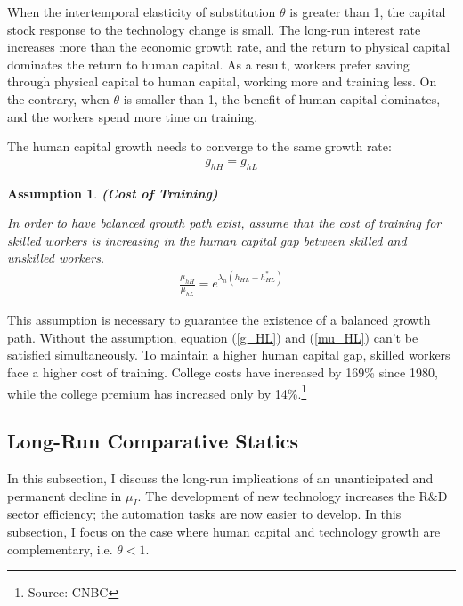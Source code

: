 \documentclass[12pt]{article}
\newtheorem{assumption}{Assumption}
\begin{document}
When the intertemporal elasticity of substitution $\theta$ is greater than 1, the capital stock response to the technology change is small. The long-run interest rate increases more than the economic growth rate, and the return to physical capital dominates the return to human capital. As a result, workers prefer saving through physical capital to human capital, working more and training less. On the contrary, when $\theta$ is smaller than 1, the benefit of human capital dominates, and the workers spend more time on training. 

The human capital growth needs to converge to the same growth rate: 
\begin{align}
\label{g_HL}
g_{hH} = g_{hL}
\end{align}

\begin{assumption}{\bf (Cost of Training)}

In order to have balanced growth path exist, assume that the cost of training for skilled workers is increasing in the human capital gap between skilled and unskilled workers. 
\begin{align}
\label{mu_HL}
\frac{\mu_{hH}}{\mu_{hL}} = e^{\lambda_h(h_{HL}-h_{HL}^*)}
\end{align}
\end{assumption}

This assumption is necessary to guarantee the existence of a balanced growth path. Without the assumption, equation (\ref{g_HL}) and (\ref{mu_HL}) can't be satisfied simultaneously. To maintain a higher human capital gap, skilled workers face a higher cost of training. College costs have increased by 169\% since 1980, while the college premium has increased only by 14\%.\footnote{Source: CNBC}


\subsection{Long-Run Comparative Statics}
In this subsection, I discuss the long-run implications of an unanticipated and permanent decline in $\mu_I$. The development of new technology increases the R\&D sector efficiency; the automation tasks are now easier to develop. In this subsection, I focus on the case where human capital and technology growth are complementary, i.e. $\theta<1$. 
\end{document}
